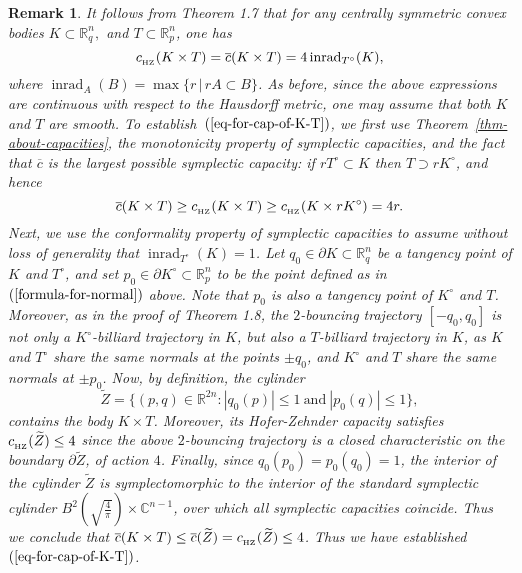 \documentclass[11pt]{article}
\def\RR{\mathbb{R}}
\def\inrad{\mathop\mathrm{inrad}\nolimits}
\newtheorem{remark}[lemma]{Remark}
\begin{document}
{\begin{remark}  \label{rem-about-K-T} {\rm
It follows from Theorem 1.7 that for any centrally symmetric convex bodies $K\subset \RR^n_q,$ and $T\subset \RR^n_p$, one has 
\begin{equation} \label{eq-for-cap-of-K-T} c_{_{\rm HZ}}(K \times T)   = \overline c(K \times T) =  4 \inrad_{T^{\circ}}(K), \end{equation}
where $\inrad_A(B) = \max\{ r \, | \, rA \subset B\}$. As before, since the above expressions are continuous with respect to the Hausdorff metric, one may assume that both $K$ and $T$ are smooth. %
To establish~$(\ref{eq-for-cap-of-K-T})$, we first use 
Theorem~\ref{thm-about-capacities}, the monotonicity property of symplectic capacities, and the fact that  $\overline c$ is the largest possible symplectic capacity: %
 if $rT^{\circ} \subset K$ then $T\supset rK^{\circ}$, and hence
\[  \overline c(K \times T) \geq   c_{_{\rm HZ}}(K\times T) \ge c_{_{\rm HZ}}(K \times rK^{\circ}) = 4r.\]
Next, we use the conformality  property of symplectic capacities to assume without loss of generality that $\inrad_{T^{\circ}}(K) = 1$. 
Let $q_0 \in \partial K \subset {\mathbb R}^n_q$ be a tangency point of $K$ and $T^{\circ}$, and set $p_0 \in \partial K^{\circ} \subset {\mathbb R}^n_p$  to be the point defined as in~$(\ref{formula-for-normal})$ above.
Note that $p_0$ is also a tangency point of $K^{\circ}$ and $T$. 
Moreover, as in the proof of Theorem 1.8, the $2$-bouncing trajectory $[-q_0,q_0]$ is not only a $K^{\circ}$-billiard trajectory in $K$, but also a $T$-billiard trajectory in $K$, as $K$ and $T^{\circ}$ share the same normals at the points $\pm q_0$, and 
 $K^{\circ}$ and $T$  share the same normals at  $\pm p_0$.  Now, by definition, the cylinder 
$$
\widetilde Z = \{(p, q) \in\mathbb R^{2n}: |q_0(p)| \le 1\ \text{and}\ |p_0(q)| \le 1\},
$$
contains the body $K \times T$. Moreover,  its Hofer-Zehnder capacity satisfies $c_{_{\rm HZ}}(\widetilde Z) \leq 4$ since the above  $2$-bouncing trajectory is a  closed characteristic on the boundary $\partial \widetilde Z$, of action $4$.
Finally, since $q_0(p_0) = p_0(q_0)=1$, the interior of the cylinder $\widetilde Z$ is symplectomorphic to the interior of the standard symplectic cylinder $B^2\left(\sqrt{\frac  4 {\pi}}\right) \times {\mathbb C}^{n-1}$, over which all symplectic capacities coincide.
Thus we conclude that $\overline c(K \times T) \leq \overline c(\widetilde Z) = c_{_{\rm HZ}}(\widetilde Z) \leq 4$. Thus we have established~$(\ref{eq-for-cap-of-K-T})$.
} 
\end{remark} 




}
\end{document}
